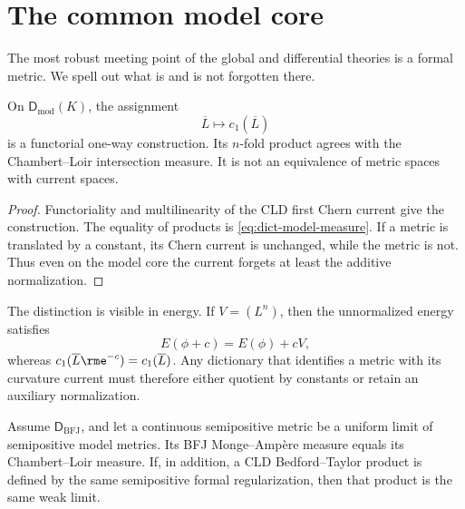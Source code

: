 \section{The common model core}
\label{sec:dict-model-core}

The most robust meeting point of the global and differential theories is a
formal metric.
We spell out what is and is not forgotten there.

\begin{proposition}\label{prop:dict-model-core}
On $\mathsf D_{\mathrm{mod}}(K)$, the assignment
\[
 \overline L\longmapsto c_1(\overline L)
\tag{63.6}\label{eq:dict-metric-to-current}
\]
is a functorial one-way construction.
Its $n$-fold product agrees with the Chambert--Loir intersection measure.
It is not an equivalence of metric spaces with current spaces.
\end{proposition}

\begin{proof}
Functoriality and multilinearity of the CLD first Chern current give the
construction.
The equality of products is
\eqref{eq:dict-model-measure}.
If a metric is translated by a constant, its Chern current is unchanged,
while the metric is not.
Thus even on the model core the current forgets at least the additive
normalization.
\end{proof}

The distinction is visible in energy.
If $V=(L^n)$, then the unnormalized energy satisfies
\[
                         E(\phi+c)=E(\phi)+cV,
\tag{63.7}\label{eq:dict-energy-translation}
\]
whereas $c_1(\overline L \rme^{-c})=c_1(\overline L)$.
Any dictionary that identifies a metric with its curvature current must
therefore either quotient by constants or retain an auxiliary normalization.

\begin{corollary}\label{cor:dict-continuous-common-locus}
Assume $\mathsf D_{\mathrm{BFJ}}$, and let a continuous semipositive
metric be a uniform limit of semipositive model metrics.
Its BFJ Monge--Amp\`ere measure equals its Chambert--Loir measure.
If, in addition, a CLD Bedford--Taylor product is defined by the same
semipositive formal regularization, then that product is the same weak
limit.
\end{corollary}

